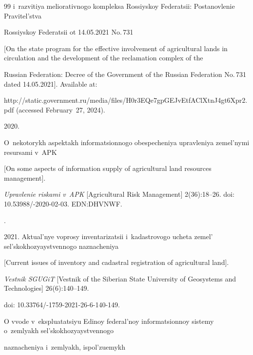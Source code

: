 {{\begin{thebibliography}{99}
i~raz\-vi\-tiya me\-lio\-ra\-tiv\-no\-go komp\-lek\-sa Ros\-siy\-skoy Fe\-de\-ra\-tsii: Po\-sta\-nov\-le\-nie Pra\-vi\-tel'st\-va 

Ros\-siy\-skoy Fe\-de\-ra\-tsii ot 14.05.2021 No.\,731 

[On the state program for the effective involvement of agricultural lands in circulation and the development of the reclamation complex of the 

Russian Federation: Decree of the Government of the Russian Federation No.\,731 dated 14.05.2021]. Available at: 

{\sf http://static.government.ru/media/files/H0r3EQe7gpGEJvEtfAClXtnJ4gt6Xpr2.pdf} (accessed February~27, 2024).




 2020. 

O~nekotorykh aspek\-takh in\-for\-ma\-tsi\-on\-no\-go obes\-pe\-che\-niya uprav\-le\-niya ze\-mel'\-ny\-mi re\-sur\-sa\-mi v~APK 

[On some aspects of information supply of agricultural land resources management]. 

 \textit{Uprav\-le\-nie ris\-ka\-mi v~APK} [Agricultural Risk Management] 2(36):18--26. doi: 10.53988\!/-2020-02-03. EDN:\linebreak DHVNWF.

 


. 

2021. Ak\-tu\-al'\-nye voprosy in\-ven\-ta\-ri\-za\-tsii i~ka\-dast\-ro\-vo\-go uche\-ta ze\-mel' sel's\-ko\-kho\-zyayst\-ven\-no\-go na\-zna\-che\-niya 

[Current issues of inventory and cadastral registration of agricultural land]. 

 \textit{Vest\-nik SGUGiT} [Vestnik of the Siberian State University of Geosystems and Technologies] 26(6):140--149.

  doi: 10.33764\!/-1759-2021-26-6-140-149.

  


O vvode v~ekspluatatsiyu Edinoy fe\-de\-ral'\-noy in\-for\-ma\-tsi\-on\-noy sis\-te\-my o~zem\-lyakh sel's\-ko\-kho\-zyayst\-ven\-no\-go 

na\-zna\-che\-niya i~zem\-lyakh, is\-pol'\-zu\-emykh 


\end{thebibliography}}}
